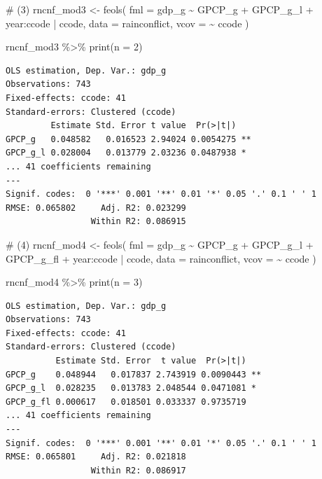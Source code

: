 \documentclass[
  a4paper,
  DIV=11,
  oneside]{scrreprt}
\newenvironment{Shaded}{\begin{snugshade}}{\end{snugshade}}
\newcommand{\AttributeTok}[1]{\textcolor[rgb]{0.40,0.45,0.13}{#1}}
\newcommand{\CommentTok}[1]{\textcolor[rgb]{0.37,0.37,0.37}{#1}}
\newcommand{\DecValTok}[1]{\textcolor[rgb]{0.68,0.00,0.00}{#1}}
\newcommand{\FunctionTok}[1]{\textcolor[rgb]{0.28,0.35,0.67}{#1}}
\newcommand{\NormalTok}[1]{\textcolor[rgb]{0.00,0.23,0.31}{#1}}
\newcommand{\OtherTok}[1]{\textcolor[rgb]{0.00,0.23,0.31}{#1}}
\newcommand{\SpecialCharTok}[1]{\textcolor[rgb]{0.37,0.37,0.37}{#1}}
\begin{document}
\begin{Shaded}
\begin{Highlighting}[]
\CommentTok{\# (3)}
\NormalTok{rncnf\_mod3 }\OtherTok{\textless{}{-}} \FunctionTok{feols}\NormalTok{(}
  \AttributeTok{fml =}\NormalTok{ gdp\_g }\SpecialCharTok{\textasciitilde{}}\NormalTok{ GPCP\_g }\SpecialCharTok{+}\NormalTok{ GPCP\_g\_l }
  \SpecialCharTok{+}\NormalTok{ year}\SpecialCharTok{:}\NormalTok{ccode}
  \SpecialCharTok{|}\NormalTok{ ccode,}
  \AttributeTok{data =}\NormalTok{ rainconflict,}
  \AttributeTok{vcov =} \SpecialCharTok{\textasciitilde{}}\NormalTok{ ccode}
\NormalTok{) }

\NormalTok{rncnf\_mod3 }\SpecialCharTok{\%\textgreater{}\%} 
  \FunctionTok{print}\NormalTok{(}\AttributeTok{n =} \DecValTok{2}\NormalTok{)}
\end{Highlighting}
\end{Shaded}

\begin{verbatim}
OLS estimation, Dep. Var.: gdp_g
Observations: 743
Fixed-effects: ccode: 41
Standard-errors: Clustered (ccode) 
         Estimate Std. Error t value  Pr(>|t|)    
GPCP_g   0.048582   0.016523 2.94024 0.0054275 ** 
GPCP_g_l 0.028004   0.013779 2.03236 0.0487938 *  
... 41 coefficients remaining
---
Signif. codes:  0 '***' 0.001 '**' 0.01 '*' 0.05 '.' 0.1 ' ' 1
RMSE: 0.065802     Adj. R2: 0.023299
                 Within R2: 0.086915
\end{verbatim}

\begin{Shaded}
\begin{Highlighting}[]
\CommentTok{\# (4)}
\NormalTok{rncnf\_mod4 }\OtherTok{\textless{}{-}} \FunctionTok{feols}\NormalTok{(}
  \AttributeTok{fml =}\NormalTok{ gdp\_g }\SpecialCharTok{\textasciitilde{}}\NormalTok{ GPCP\_g }\SpecialCharTok{+}\NormalTok{ GPCP\_g\_l }\SpecialCharTok{+}\NormalTok{ GPCP\_g\_fl}
  \SpecialCharTok{+}\NormalTok{ year}\SpecialCharTok{:}\NormalTok{ccode }
  \SpecialCharTok{|}\NormalTok{ ccode,}
  \AttributeTok{data =}\NormalTok{ rainconflict,}
  \AttributeTok{vcov =} \SpecialCharTok{\textasciitilde{}}\NormalTok{ ccode}
\NormalTok{) }

\NormalTok{rncnf\_mod4 }\SpecialCharTok{\%\textgreater{}\%} 
  \FunctionTok{print}\NormalTok{(}\AttributeTok{n =} \DecValTok{3}\NormalTok{)}
\end{Highlighting}
\end{Shaded}

\begin{verbatim}
OLS estimation, Dep. Var.: gdp_g
Observations: 743
Fixed-effects: ccode: 41
Standard-errors: Clustered (ccode) 
          Estimate Std. Error  t value  Pr(>|t|)    
GPCP_g    0.048944   0.017837 2.743919 0.0090443 ** 
GPCP_g_l  0.028235   0.013783 2.048544 0.0471081 *  
GPCP_g_fl 0.000617   0.018501 0.033337 0.9735719    
... 41 coefficients remaining
---
Signif. codes:  0 '***' 0.001 '**' 0.01 '*' 0.05 '.' 0.1 ' ' 1
RMSE: 0.065801     Adj. R2: 0.021818
                 Within R2: 0.086917
\end{verbatim}
\end{document}
